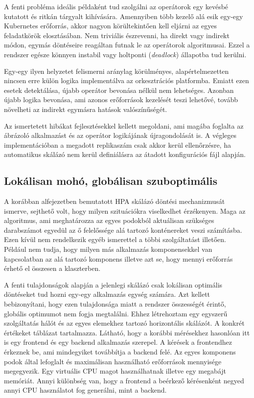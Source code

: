 A fenti probléma ideális példaként tud szolgálni az operátorok egy kevésbé kutatott és ritkán tárgyalt kihívására.
Amennyiben több kezelő alá esik egy-egy Kubernetes erőforrás, akkor nagyon körültekintően kell eljárni az egyes feladatkörök elosztásában.
Nem triviális észrevenni, ha direkt vagy indirekt módon, egymás döntéseire reagáltan futnak le az operátorok algoritmusai.
Ezzel a rendszer egésze könnyen instabil vagy holtponti (\textit{deadlock}) állapotba tud kerülni.

Egy-egy ilyen helyzetet felismerni aránylag körülményes, alapértelmezetten nincsen erre külön logika implementálva az orkesztrációs platformba.
Emiatt ezen esetek detektálása, újabb operátor bevonása nélkül nem lehetséges.
Azonban újabb logika bevonása, ami azonos erőforrások kezelését teszi lehetővé, tovább növelheti az indirekt egymásra hatások valószínűségét.

Az ismertetett hibákat fejlesztésekkel kellett megoldani, ami magába foglalta az ábrázoló alkalmazást és az operátor logikájának újragondolását is.
A végleges implementációban a megadott replikaszám csak akkor kerül ellenőrzésre, ha automatikus skálázó nem kerül definiálásra az átadott konfigurációs fájl alapján.

\subsection{Lokálisan mohó, globálisan szuboptimális}
\label{subsec:first-HPA-measure}

A korábban  alfejezetben bemutatott HPA skálázó döntési mechanizmusát ismerve, sejthető volt, hogy milyen szituációkra viselkedhet érzékenyen.
Maga az algoritmus, ami meghatározza az egyes podokból aktuálisan szükséges darabszámot egyedül az ő felelőssége alá tartozó konténereket veszi számításba.
Ezen kívül nem rendelkezik egyéb ismerettel a többi szolgáltatást illetően.
Például nem tudja, hogy milyen más alkalmazás komponensekkel van kapcsolatban az alá tartozó komponens illetve azt se, hogy mennyi erőforrás érhető el összesen a klaszterben.

A fenti tulajdonságok alapján a jelenlegi skálázó csak lokálisan optimális döntéseket tud hozni egy-egy alkalmazás egység számára.
Azt kellett bebizonyítani, hogy ezen tulajdonsága miatt a rendszer összességét érintő, globális optimumot nem fogja megtalálni.
Ehhez létrehoztam egy egyszerű szolgáltatás hálót és az egyes elemekhez tartozó horizontális skálázót. 
A konkrét értékeket  táblázat tartalmazza.
Látható, hogy a korábbi mérésekhez hasonlóan itt is egy frontend és egy backend alkalmazás szerepel. 
A kérések a frontendhez érkeznek be, ami mindegyiket továbbítja a backend felé. 
Az egyes komponens podok által lefoglalt és maximálisan használható erőforrások mennyisége megegyezik.
Egy virtuális CPU magot használhatnak illetve egy megabájt memóriát.
Annyi különbség van, hogy a frontend a beérkező kérésenként negyed annyi CPU használatot fog generálni, mint a backend.

